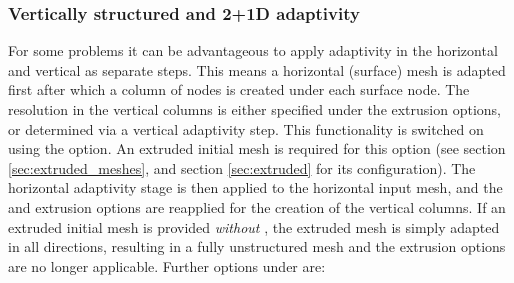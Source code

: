 \subsubsection{Vertically structured and 2+1D adaptivity}
\label{sec:vertically_structured_adaptivity}
For some problems it can be advantageous to apply adaptivity in the horizontal
and vertical as separate steps. This means a horizontal (surface) mesh is
adapted first after which a column of nodes is created under each surface node.
The resolution in the vertical columns is either specified under the extrusion
options, or determined via a vertical adaptivity step. This functionality is switched
on using the  option. An extruded
initial mesh is required for this option (see section \ref{sec:extruded_meshes},
and section \ref{sec:extruded} for its configuration). The horizontal adaptivity
stage is then applied to the horizontal input mesh, and the
 and  extrusion options are
 reapplied for the creation of the vertical columns.
If an extruded initial mesh is
provided \emph{without} , the extruded 
mesh is simply adapted in all directions, resulting in a fully unstructured mesh
and the extrusion options are no longer applicable. Further options under
 are:
